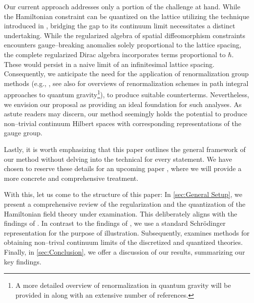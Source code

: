 Our current approach addresses only a portion of the challenge at hand. 
While the Hamiltonian constraint can be quantized on the lattice utilizing the technique introduced in \textcite{cholesky}, bridging the gap to its continuum limit necessitates a distinct undertaking. 
While the regularized algebra of spatial diffeomorphism constraints encounters gauge--breaking anomalies solely proportional to the lattice spacing, the complete regularized Dirac algebra incorporates terms proportional to $\hbar$.
These would persist in a naive limit of an infinitesimal lattice spacing.
Consequently, we anticipate the need for the application of renormalization group methods (e.g., \textcite{Lang:2017beo,Thiemann-Renormalization}, see also \textcite{Asante:2022dnj,Ambjorn:2020rcn,Saueressig:2023irs} for overviews of renormalization schemes in path integral approaches to quantum gravity\footnote{A more detailed overview of renormalization in quantum gravity will be provided in \textcite{gravity-continuum} along with an extensive number of references.}), to produce suitable counterterms.
Nevertheless, we envision our proposal as providing an ideal foundation for such analyses. 
As astute readers may discern, our method seemingly holds the potential to produce non--trivial continuum Hilbert spaces with corresponding representations of the gauge group. 

Lastly, it is worth emphasizing that this paper outlines the general framework of our method without delving into the technical for every statement. 
We have chosen to reserve these details for an upcoming paper \parencite{gravity-continuum}, where we will provide a more concrete and comprehensive treatment. 

With this, let us come to the structure of this paper:
In \cref{sec:General Setup}, we present a comprehensive review of the regularization and the quantization of the Hamiltonian field theory under examination.
This deliberately aligns with the findings of \textcite{lattice}.
In contrast to the findings of \textcite{cholesky}, we use a standard Schrödinger representation for the purpose of illustration.
Subsequently,  examines methods for obtaining non--trival continuum limits of the discretized and quantized theories.
Finally, in \cref{sec:Conclusion}, we offer a discussion of our results, summarizing our key findings.
